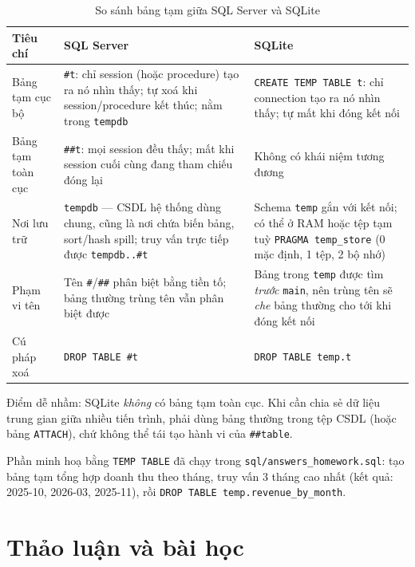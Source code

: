 \documentclass[12pt,a4paper]{article}
\newcommand{\code}[1]{\texttt{\small #1}}
\begin{document}
\begin{table}[H]
\centering
\caption{So sánh bảng tạm giữa SQL Server và SQLite}
\label{tab:s21}
\small
\begin{tabularx}{\linewidth}{@{}l X l@{}}
\toprule
\textbf{Tiêu chí} & \textbf{SQL Server} & \textbf{SQLite} \\
\midrule
Bảng tạm cục bộ &
\code{\#t}: chỉ session (hoặc procedure) tạo ra nó nhìn thấy; tự xoá khi session/procedure kết
thúc; nằm trong \code{tempdb} &
\code{CREATE TEMP TABLE t}: chỉ connection tạo ra nó nhìn thấy; tự mất khi đóng kết nối \\
Bảng tạm toàn cục &
\code{\#\#t}: mọi session đều thấy; mất khi session cuối cùng đang tham chiếu đóng lại &
Không có khái niệm tương đương \\
Nơi lưu trữ &
\code{tempdb} --- CSDL hệ thống dùng chung, cũng là nơi chứa biến bảng, sort/hash spill;
truy vấn trực tiếp được \code{tempdb..\#t} &
Schema \code{temp} gắn với kết nối; có thể ở RAM hoặc tệp tạm tuỳ \code{PRAGMA temp\_store}
(0 mặc định, 1 tệp, 2 bộ nhớ) \\
Phạm vi tên &
Tên \code{\#}/\code{\#\#} phân biệt bằng tiền tố; bảng thường trùng tên vẫn phân biệt được &
Bảng trong \code{temp} được tìm \emph{trước} \code{main}, nên trùng tên sẽ \emph{che} bảng
thường cho tới khi đóng kết nối \\
Cú pháp xoá &
\code{DROP TABLE \#t} &
\code{DROP TABLE temp.t} \\
\bottomrule
\end{tabularx}
\end{table}

Điểm dễ nhầm: SQLite \emph{không} có bảng tạm toàn cục. Khi cần chia sẻ dữ liệu trung gian giữa
nhiều tiến trình, phải dùng bảng thường trong tệp CSDL (hoặc bảng \code{ATTACH}), chứ không thể
tái tạo hành vi của \code{\#\#table}.

Phần minh hoạ bằng \code{TEMP TABLE} đã chạy trong \code{sql/answers\_homework.sql}: tạo bảng
tạm tổng hợp doanh thu theo tháng, truy vấn 3 tháng cao nhất (kết quả: 2025-10, 2026-03,
2025-11), rồi \code{DROP TABLE temp.revenue\_by\_month}.

\section{Thảo luận và bài học}
\end{document}
